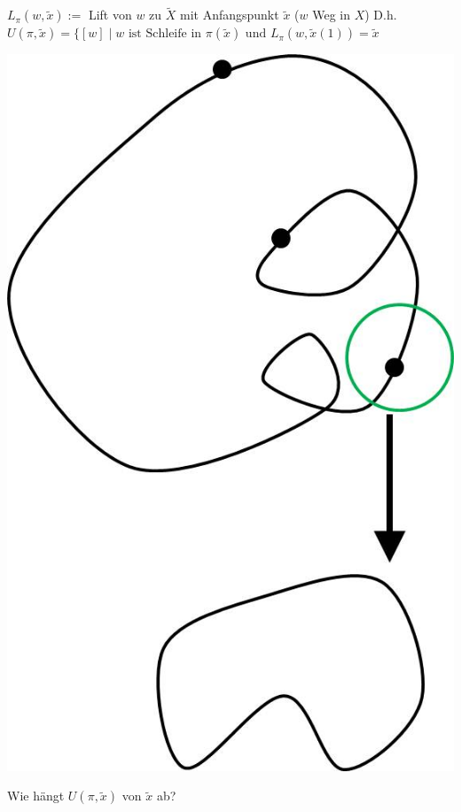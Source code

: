 \documentclass[a4paper,11pt,notitlepage]{report}
\theoremstyle{definition}
\newenvironment{definition}[1]{
	\begin{definitions}
	\marginnote{\emph{#1}}
}{\end{definitions}}
\begin{document}
\begin{definition}{Lift}
	$L_{\pi}(w, \widetilde{x}):=$ Lift von $w$ zu $\widetilde{X}$ mit Anfangspunkt $\widetilde{x}$ ($w$ Weg in $X$)
	\newline
	D.h. $U(\pi, \widetilde{x}) = \{[w] \mid \text{$w$ ist Schleife in $\pi(\widetilde{x})$ und $L_\pi(w, \widetilde{x}(1)) = \widetilde{x}$}$
\begin{center} 
\includegraphics[scale=0.3]{images/Lift.jpg}
\end{center}
	Wie hängt $U(\pi, \widetilde{x})$ von $\widetilde{x}$ ab?
\end{definition}
\end{document}
